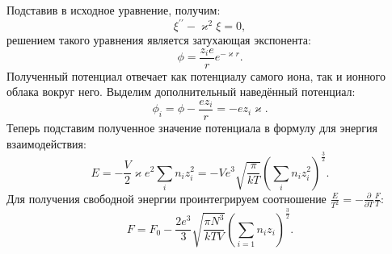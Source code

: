 \documentclass[12pt]{article}
\begin{document}
Подставив в исходное уравнение, получим: 
\[
    \xi^{\prime\prime} - \varkappa^2 \xi = 0,
\]
решением такого уравнения является затухающая экспонента: 
\[
    \phi = \frac{z_i e}{r} e^{-\varkappa r}.
\]
Полученный потенциал отвечает как потенциалу самого иона, так и ионного облака вокруг него.
Выделим дополнительный наведённый потенциал: 
\[
    \phi_i = \phi - \frac{e z_i}{r} = - e z_i \varkappa.
\]
Теперь подставим полученное значение потенциала в формулу для энергия взаимодействия: 
\[
    E = -\frac{V}{2} \varkappa e^2 \sum_{i} n_i z_i^2 = 
    -V e^3 \sqrt{\frac{\pi}{kT}} \left( \sum_{i} n_i z_i^2 \right)^\frac{3}{2}. 
\]
Для получения свободной энергии проинтегрируем соотношение 
$\frac{E}{T^2} = - \frac{\partial}{\partial T} \frac{F}{T}$: 
\[
    F = F_0 - \frac{2e^3}{3} \sqrt{\frac{\pi N^3}{kTV}}\left( \sum_{i=1} n_i z_i \right)^\frac{3}{2}.
\] 
\end{document}

